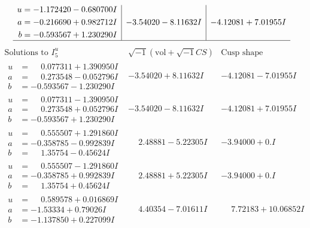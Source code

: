 \documentclass[1p]{elsarticle_modified}
\theoremstyle{definition}
\newcommand{\I}{\sqrt{-1}}
\begin{document}
$$\begin{array}{c|c|c}
\begin{aligned}
u &= -1.172420 - 0.680700 I \\
a &= -0.216690 + 0.982712 I \\
b &= -0.593567 + 1.230290 I\end{aligned}
 & -3.54020 - 8.11632 I & -4.12081 + 7.01955 I\\
 \hline 
 \end{array}$$\newpage$$\begin{array}{c|c|c}  
\text{Solutions to }I^u_{5}& \I (\text{vol} + \sqrt{-1}CS) & \text{Cusp shape}\\
 \hline 
\begin{aligned}
u &= \phantom{-}0.077311 + 1.390950 I \\
a &= \phantom{-}0.273548 - 0.052796 I \\
b &= -0.593567 - 1.230290 I\end{aligned}
 & -3.54020 + 8.11632 I & -4.12081 - 7.01955 I \\ \hline\begin{aligned}
u &= \phantom{-}0.077311 - 1.390950 I \\
a &= \phantom{-}0.273548 + 0.052796 I \\
b &= -0.593567 + 1.230290 I\end{aligned}
 & -3.54020 - 8.11632 I & -4.12081 + 7.01955 I \\ \hline\begin{aligned}
u &= \phantom{-}0.555507 + 1.291860 I \\
a &= -0.358785 - 0.992839 I \\
b &= \phantom{-}1.35754 - 0.45624 I\end{aligned}
 & \phantom{-}2.48881 - 5.22305 I & -3.94000 + 0. I\phantom{ +0.000000I} \\ \hline\begin{aligned}
u &= \phantom{-}0.555507 - 1.291860 I \\
a &= -0.358785 + 0.992839 I \\
b &= \phantom{-}1.35754 + 0.45624 I\end{aligned}
 & \phantom{-}2.48881 + 5.22305 I & -3.94000 + 0. I\phantom{ +0.000000I} \\ \hline\begin{aligned}
u &= \phantom{-}0.589578 + 0.016869 I \\
a &= -1.53334 + 0.79026 I \\
b &= -1.137850 + 0.227099 I\end{aligned}
 & \phantom{-}4.40354 - 7.01611 I & \phantom{-}7.72183 + 10.06852 I \\ \hline\begin{aligned}

\end{aligned}
\end{array}$$
\end{document}
